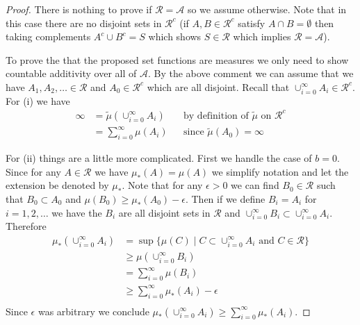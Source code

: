 \begin{proof}
There is nothing to prove if $\mathcal{R} =
\mathcal{A}$ so we assume otherwise.  Note that in this case there are no
disjoint sets in $\mathcal{R}^c$ (if $A,B \in \mathcal{R}^c$ satisfy
$A \cap B = \emptyset$ then taking complements $A^c \cup B^c = S$
which shows $S \in \mathcal{R}$ which implies $\mathcal{R} =
\mathcal{A}$).

To prove the that the proposed set functions are measures we only need
to show countable additivity over all of $\mathcal{A}$.  By the above
comment we can assume that we have $A_1, A_2, \dots \in \mathcal{R}$
and $A_0 \in \mathcal{R}^c$ which are all disjoint.  Recall that $\cup_{i=0}^\infty
A_i \in \mathcal{R}^c$.  For (i) we have
\begin{align*}
\infty &= \tilde{\mu}(\cup_{i=0}^\infty A_i ) & &\text{by
  definition of $\tilde{\mu}$ on $\mathcal{R}^c$} \\
&=\sum_{i=0}^\infty \mu(A_i) & & \text{since $\tilde{\mu}(A_0)=\infty$}
\end{align*}

For (ii) things are a little more complicated.  First we handle the
case of $b=0$.  Since for any $A \in \mathcal{R}$ we have $\mu_*(A) =
\mu(A)$ we simplify notation and let the extension be denoted by $\mu_*$.  Note that 
for any $\epsilon > 0$ we can find $B_0 \in \mathcal{R}$ such that
$B_0 \subset A_0$ and $\mu(B_0) \geq \mu_*(A_0) -\epsilon$.  Then if
we define $B_i = A_i$ for $i=1,2,\dotsc$ we have the $B_i$ are all disjoint sets in
$\mathcal{R}$ and $\cup_{i=0}^\infty B_i \subset \cup_{i=0}^\infty A_i $.  Therefore
\begin{align*}
\mu_*(\cup_{i=0}^\infty A_i) &= \sup \lbrace \mu(C) \mid C \subset
\cup_{i=0}^\infty A_i \text{ and } C \in \mathcal{R}\rbrace \\
&\geq \mu(\cup_{i=0}^\infty B_i) \\
&= \sum_{i=0}^\infty \mu(B_i) \\
&\geq \sum_{i=0}^\infty \mu_*(A_i) - \epsilon \\
\end{align*}
Since $\epsilon$ was arbitrary we conclude
$\mu_*(\cup_{i=0}^\infty A_i) \geq \sum_{i=0}^\infty \mu_*(A_i)$.


\end{proof}
